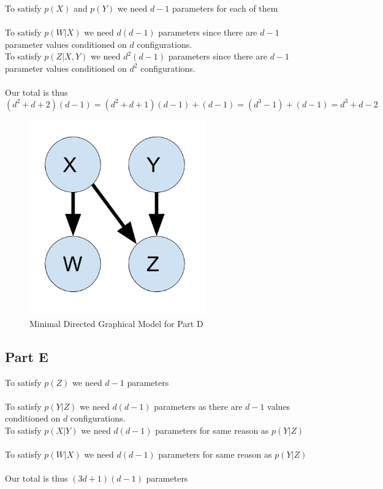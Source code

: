 \documentclass[twoside,11pt]{article}
\theoremstyle{definition}
\begin{document}
To satisfy $p(X)$ and $p(Y)$ we need $d-1$ parameters for each of them\\
\\
To satisfy $p(W|X)$ we need $d(d-1)$ parameters since there are $d-1$ parameter values conditioned on $d$ configurations. \\
To satisfy $p(Z|X,Y)$ we need $d^2(d-1)$ parameters since there are $d-1$ parameter values conditioned on $d^2$ configurations.\\
\\
Our total is thus
\[
(d^2+d+2)(d-1) = (d^2+d+1)(d-1) + (d-1) = (d^3-1) + (d-1) = d^3 + d - 2
\]
\begin{figure}[h]
\centering
\includegraphics[width=3in]{HW1_Prob1_partD.png}
\caption{Minimal Directed Graphical Model for Part D}
\end{figure}

\newpage

\subsection*{Part E}

To satisfy $p(Z)$ we need $d-1$ parameters\\
\\
To satisfy $p(Y|Z)$ we need $d(d-1)$ parameters as there are $d-1$ values conditioned on $d$ configurations. \\
To satisfy $p(X|Y)$ we need $d(d-1)$ parameters for same reason as $p(Y|Z)$\\
\\
To satisfy $p(W|X)$ we need $d(d-1)$ parameters for same reason as $p(Y|Z)$\\
\\
Our total is thus $(3d+1)(d-1)$ parameters
\end{document}

